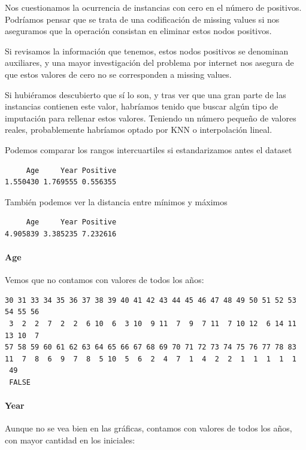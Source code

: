 Nos cuestionamos la ocurrencia de instancias con cero en el número de positivos. Podríamos pensar que se trata de una codificación de missing values si nos aseguramos que la operación consistan en eliminar estos nodos positivos.

Si revisamos la información que tenemos, estos nodos positivos se denominan auxiliares, y una mayor investigación del problema por internet nos asegura de que estos valores de cero no se corresponden a missing values.

Si hubiéramos descubierto que sí lo son, y tras ver que una gran parte de las instancias contienen este valor, habríamos tenido que buscar algún tipo de imputación para rellenar estos valores. Teniendo un número pequeño de valores reales, probablemente habríamos optado por KNN o interpolación lineal.

Podemos comparar los rangos intercuartiles si estandarizamos antes el dataset

\begin{verbatim}
     Age     Year Positive 
1.550430 1.769555 0.556355 
\end{verbatim}

También podemos ver la distancia entre mínimos y máximos

\begin{verbatim}
     Age     Year Positive 
4.905839 3.385235 7.232616 
\end{verbatim}


\paragraph{Age}

Vemos que no contamos con valores de todos los años:

\begin{verbatim}
30 31 33 34 35 36 37 38 39 40 41 42 43 44 45 46 47 48 49 50 51 52 53 54 55 56 
 3  2  2  7  2  2  6 10  6  3 10  9 11  7  9  7 11  7 10 12  6 14 11 13 10  7 
57 58 59 60 61 62 63 64 65 66 67 68 69 70 71 72 73 74 75 76 77 78 83 
11  7  8  6  9  7  8  5 10  5  6  2  4  7  1  4  2  2  1  1  1  1  1 
 49
 FALSE
\end{verbatim}


\paragraph{Year}

Aunque no se vea bien en las gráficas, contamos con valores de todos los años, con mayor cantidad en los iniciales:


